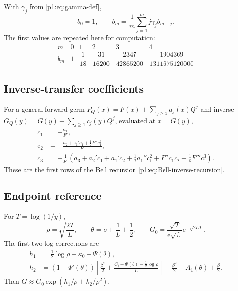 \documentclass[11pt,oneside]{article}
\numberwithin{equation}{section}
\theoremstyle{definition}
\theoremstyle{remark}
\newcommand{\e}{\mathrm e}
\begin{document}
With $\gamma_j$ from \eqref{p1:eq:gamma-def},
\begin{equation}
 b_0=1,
 \qquad
 b_m=\frac1m\sum_{j=1}^{m}j\gamma_jb_{m-j}.
 \label{p1:eq:b-reference-rec}
\end{equation}
The first values are repeated here for computation:
\begin{equation}
 \begin{array}{c|ccccc}
 m&0&1&2&3&4\\ \hline
 b_m&1&\dfrac1{18}&\dfrac{31}{16200}&
 \dfrac{2347}{42865200}&\dfrac{1904369}{1311675120000}
 \end{array}
 \label{p1:eq:b-reference-table}
\end{equation}

\subsection{Inverse-transfer coefficients}

For a general forward germ
$P_Q(x)=F(x)+\sum_{j\ge1}a_j(x)Q^j$ and inverse
$G_Q(y)=G(y)+\sum_{j\ge1}c_j(y)Q^j$, evaluated at $x=G(y)$,
\begin{align}
 c_1&=-\frac{a_1}{F'},
 \label{p1:eq:c1-general-ref}\\
 c_2&=-\frac{a_2+a_1'c_1+\tfrac12F''c_1^2}{F'},
 \label{p1:eq:c2-general-ref}\\
 c_3&=-\frac{1}{F'}\left(
 a_3+a_2'c_1+a_1'c_2+\frac12a_1''c_1^2
 +F''c_1c_2+\frac16F'''c_1^3\right).
 \label{p1:eq:c3-general-ref}
\end{align}
These are the first rows of the Bell recursion \eqref{p1:eq:Bell-inverse-recursion}.

\subsection{Endpoint reference}

For $T=\log(1/y)$,
\begin{equation}
 \rho=\sqrt{\frac{2T}{L}},
 \qquad
 \theta=\rho+\frac1L+\frac12,
 \qquad
 G_0=\frac{\sqrt T}{\e\sqrt L}\e^{-\sqrt{2LT}}.
 \label{p1:eq:endpoint-reference-vars}
\end{equation}
The first two log-corrections are
\begin{align}
 h_1&=\frac12\log\rho+\kappa_0-\Psi(\theta),
 \label{p1:eq:h1-reference}\\
 h_2&=(1-\Psi'(\theta))
 \left[\frac{\beta^2}{2}+\frac{C_{\sharp}+\Psi(\theta)-\tfrac12\log\rho}{L}\right]
 -\frac{\beta^2}{2}-A_1(\theta)+\frac\beta2.
 \label{p1:eq:h2-reference}
\end{align}
Then $G\approx G_0\exp(h_1/\rho+h_2/\rho^2)$.
\end{document}
